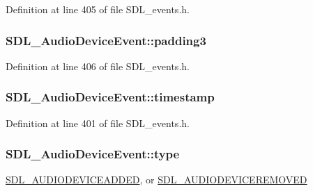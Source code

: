 Definition at line 405 of file S\-D\-L\-\_\-events.\-h.

\hypertarget{struct_s_d_l___audio_device_event_af3163ba92c77f08a4f0d8f043f24c96c}{
\subsubsection[{padding3}]{ S\-D\-L\-\_\-\-Audio\-Device\-Event\-::padding3}}\label{struct_s_d_l___audio_device_event_af3163ba92c77f08a4f0d8f043f24c96c}


Definition at line 406 of file S\-D\-L\-\_\-events.\-h.

\hypertarget{struct_s_d_l___audio_device_event_aa471680486a6103eafc9af569016df57}{
\subsubsection[{timestamp}]{ S\-D\-L\-\_\-\-Audio\-Device\-Event\-::timestamp}}\label{struct_s_d_l___audio_device_event_aa471680486a6103eafc9af569016df57}


Definition at line 401 of file S\-D\-L\-\_\-events.\-h.

\hypertarget{struct_s_d_l___audio_device_event_ae68c3bd49b49608711a17395c7cbfe58}{
\subsubsection[{type}]{ S\-D\-L\-\_\-\-Audio\-Device\-Event\-::type}}\label{struct_s_d_l___audio_device_event_ae68c3bd49b49608711a17395c7cbfe58}
\hyperlink{_s_d_l__events_8h_a3b589e89be6b35c02e0dd34a55f3fccaadb3154654baf003910e75d74b507a82b}{S\-D\-L\-\_\-\-A\-U\-D\-I\-O\-D\-E\-V\-I\-C\-E\-A\-D\-D\-E\-D}, or \hyperlink{_s_d_l__events_8h_a3b589e89be6b35c02e0dd34a55f3fccaad56f8934fe24ee4c0cd9329e3c57c0c2}{S\-D\-L\-\_\-\-A\-U\-D\-I\-O\-D\-E\-V\-I\-C\-E\-R\-E\-M\-O\-V\-E\-D} 

